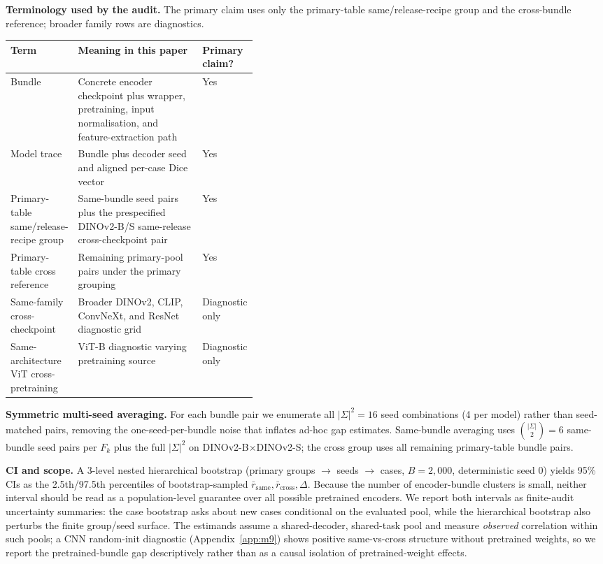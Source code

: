 \documentclass{article}
\begin{document}
\begin{center}
  \scriptsize
  \textbf{Terminology used by the audit.} The primary claim uses only the primary-table same/release-recipe group and the cross-bundle reference; broader family rows are diagnostics.\\[2pt]
  \setlength{\tabcolsep}{3pt}
  \begin{tabularx}{\linewidth}{p{0.23\linewidth}Yp{0.18\linewidth}}
    \toprule
    Term & Meaning in this paper & Primary claim? \\
    \midrule
    Bundle & Concrete encoder checkpoint plus wrapper, pretraining, input normalisation, and feature-extraction path & Yes \\
    Model trace & Bundle plus decoder seed and aligned per-case Dice vector & Yes \\
    Primary-table same/release-recipe group & Same-bundle seed pairs plus the prespecified DINOv2-B/S same-release cross-checkpoint pair & Yes \\
    Primary-table cross reference & Remaining primary-pool pairs under the primary grouping & Yes \\
    Same-family cross-checkpoint & Broader DINOv2, CLIP, ConvNeXt, and ResNet diagnostic grid & Diagnostic only \\
    Same-architecture ViT cross-pretraining & ViT-B diagnostic varying pretraining source & Diagnostic only \\
    \bottomrule
  \end{tabularx}
\end{center}

\textbf{Symmetric multi-seed averaging.} For each bundle pair we enumerate all $|\Sigma|^2{=}16$ seed combinations (4 per model) rather than seed-matched pairs, removing the one-seed-per-bundle noise that inflates ad-hoc gap estimates. Same-bundle averaging uses $\binom{|\Sigma|}{2}{=}6$ same-bundle seed pairs per $F_k$ plus the full $|\Sigma|^2$ on DINOv2-B$\times$DINOv2-S; the cross group uses all remaining primary-table bundle pairs.

\textbf{CI and scope.} A 3-level nested hierarchical bootstrap (primary groups $\to$ seeds $\to$ cases, $B{=}2{,}000$, deterministic seed $0$) yields 95\% CIs as the 2.5th/97.5th percentiles of bootstrap-sampled $\bar r_{\mathrm{same}}, \bar r_{\mathrm{cross}}, \Delta$. Because the number of encoder-bundle clusters is small, neither interval should be read as a population-level guarantee over all possible pretrained encoders. We report both intervals as finite-audit uncertainty summaries: the case bootstrap asks about new cases conditional on the evaluated pool, while the hierarchical bootstrap also perturbs the finite group/seed surface. The estimands assume a shared-decoder, shared-task pool and measure \emph{observed} correlation within such pools; a CNN random-init diagnostic (Appendix~\ref{app:m9}) shows positive same-vs-cross structure without pretrained weights, so we report the pretrained-bundle gap descriptively rather than as a causal isolation of pretrained-weight effects.
\end{document}
